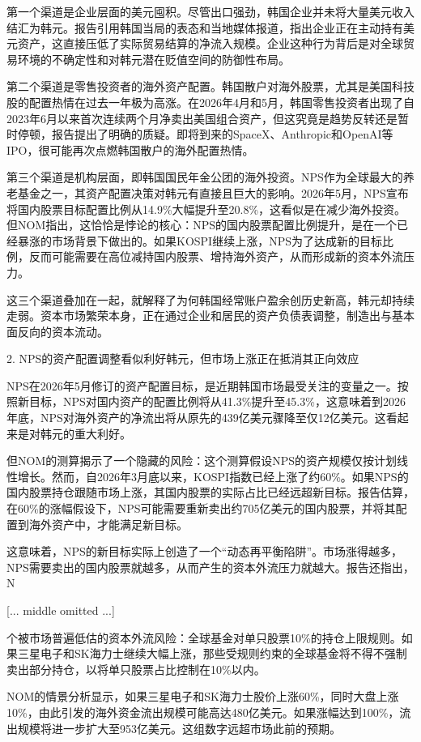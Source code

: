 \documentclass[11pt]{ctexart}
\begin{document}
第一个渠道是企业层面的美元囤积。尽管出口强劲，韩国企业并未将大量美元收入结汇为韩元。报告引用韩国当局的表态和当地媒体报道，指出企业正在主动持有美元资产，这直接压低了实际贸易结算的净流入规模。企业这种行为背后是对全球贸易环境的不确定性和对韩元潜在贬值空间的防御性布局。

第二个渠道是零售投资者的海外资产配置。韩国散户对海外股票，尤其是美国科技股的配置热情在过去一年极为高涨。在2026年4月和5月，韩国零售投资者出现了自2023年6月以来首次连续两个月净卖出美国组合资产，但这究竟是趋势反转还是暂时停顿，报告提出了明确的质疑。即将到来的SpaceX、Anthropic和OpenAI等IPO，很可能再次点燃韩国散户的海外配置热情。

第三个渠道是机构层面，即韩国国民年金公团的海外投资。NPS作为全球最大的养老基金之一，其资产配置决策对韩元有直接且巨大的影响。2026年5月，NPS宣布将国内股票目标配置比例从14.9\%大幅提升至20.8\%，这看似是在减少海外投资。但NOM指出，这恰恰是悖论的核心：NPS的国内股票配置比例提升，是在一个已经暴涨的市场背景下做出的。如果KOSPI继续上涨，NPS为了达成新的目标比例，反而可能需要在高位减持国内股票、增持海外资产，从而形成新的资本外流压力。

这三个渠道叠加在一起，就解释了为何韩国经常账户盈余创历史新高，韩元却持续走弱。资本市场繁荣本身，正在通过企业和居民的资产负债表调整，制造出与基本面反向的资本流动。

2. NPS的资产配置调整看似利好韩元，但市场上涨正在抵消其正向效应

NPS在2026年5月修订的资产配置目标，是近期韩国市场最受关注的变量之一。按照新目标，NPS对国内资产的配置比例将从41.3\%提升至45.3\%，这意味着到2026年底，NPS对海外资产的净流出将从原先的439亿美元骤降至仅12亿美元。这看起来是对韩元的重大利好。

但NOM的测算揭示了一个隐藏的风险：这个测算假设NPS的资产规模仅按计划线性增长。然而，自2026年3月底以来，KOSPI指数已经上涨了约60\%。如果NPS的国内股票持仓跟随市场上涨，其国内股票的实际占比已经远超新目标。报告估算，在60\%的涨幅假设下，NPS可能需要重新卖出约705亿美元的国内股票，并将其配置到海外资产中，才能满足新目标。

这意味着，NPS的新目标实际上创造了一个“动态再平衡陷阱”。市场涨得越多，NPS需要卖出的国内股票就越多，从而产生的资本外流压力就越大。报告还指出，N

[... middle omitted ...]

个被市场普遍低估的资本外流风险：全球基金对单只股票10\%的持仓上限规则。如果三星电子和SK海力士继续大幅上涨，那些受规则约束的全球基金将不得不强制卖出部分持仓，以将单只股票占比控制在10\%以内。

NOM的情景分析显示，如果三星电子和SK海力士股价上涨60\%，同时大盘上涨10\%，由此引发的海外资金流出规模可能高达480亿美元。如果涨幅达到100\%，流出规模将进一步扩大至953亿美元。这组数字远超市场此前的预期。
\end{document}
